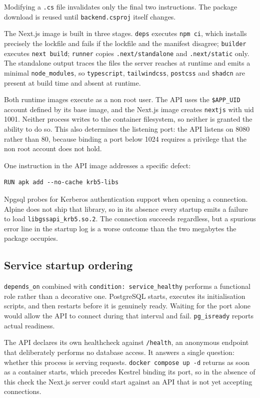 \documentclass[11pt,a4paper]{article}
\newcommand{\code}[1]{\texttt{\fontsize{8.6}{10}\selectfont #1}}
\begin{document}
Modifying a \code{.cs} file invalidates only the final two instructions. The
package download is reused until \code{backend.csproj} itself changes.

The Next.js image is built in three stages. \code{deps} executes \code{npm ci},
which installs precisely the lockfile and fails if the lockfile and the manifest
disagree; \code{builder} executes \code{next build}; \code{runner} copies
\code{.next/standalone} and \code{.next/static} only. The standalone output
traces the files the server reaches at runtime and emits a minimal
\code{node\_modules}, so \code{typescript}, \code{tailwindcss}, \code{postcss}
and \code{shadcn} are present at build time and absent at runtime.

Both runtime images execute as a non root user. The API uses the
\code{\$APP\_UID} account defined by its base image, and the Next.js image
creates \code{nextjs} with uid 1001. Neither process writes to the container
filesystem, so neither is granted the ability to do so. This also determines the
listening port: the API listens on 8080 rather than 80, because binding a port
below 1024 requires a privilege that the non root account does not hold.

One instruction in the API image addresses a specific defect:

\begin{lstlisting}
RUN apk add --no-cache krb5-libs
\end{lstlisting}

Npgsql probes for Kerberos authentication support when opening a connection.
Alpine does not ship that library, so in its absence every startup emits a
failure to load \code{libgssapi\_krb5.so.2}. The connection succeeds
regardless, but a spurious error line in the startup log is a worse outcome
than the two megabytes the package occupies.

\subsection{Service startup ordering}

\code{depends\_on} combined with \code{condition: service\_healthy} performs a
functional role rather than a decorative one. PostgreSQL starts, executes its
initialisation scripts, and then restarts before it is genuinely ready. Waiting
for the port alone would allow the API to connect during that interval and
fail. \code{pg\_isready} reports actual readiness.

The API declares its own healthcheck against \code{/health}, an anonymous
endpoint that deliberately performs no database access. It answers a single
question: whether this process is serving requests.
\code{docker compose up -d} returns as soon as a container starts, which
precedes Kestrel binding its port, so in the absence of this check the Next.js
server could start against an API that is not yet accepting connections.
\end{document}
